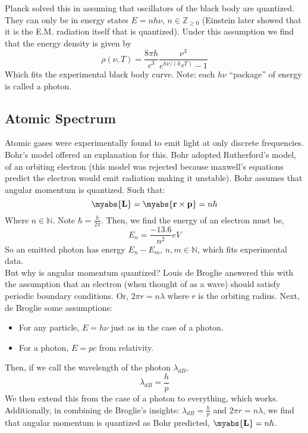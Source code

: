\documentclass[11pt]{article}
\theoremstyle{definition}
\begin{document}
Planck solved this in assuming that oscillators of the black body are
quantized. They can only be in energy states $E = nh\nu$, $n \in
\mathbb{Z}_{\geq 0}$ (Einstein later showed that it is the E.M. radiation
itself that is quantized). Under this assumption we find that the energy
density is given by
\begin{equation*}
    \rho(\nu, T) = \frac{8\pi h}{c^3}\frac{\nu^3}{e^{h \nu / (k_B T)}-1}
    \tag{Plank's Formula}
\end{equation*}
Which fits the experimental black body curve. Note: each $h\nu$ ``package''
of energy is called a photon.
\subsection{Atomic Spectrum}
Atomic gases were experimentally found to emit light at only discrete
frequencies.
Bohr's model offered an explanation for this.
Bohr adopted Rutherford's model, of an orbiting electron (this model was
rejected because maxwell's equations predict the electron would emit
radiation making it unstable). Bohr assumes that angular momentum is
quantized. Such that:
$$ \myabs{\mathbf{L}} = \myabs{\mathbf{r} \times \mathbf{p}} = n \hbar $$
Where $n \in \mathbb{N}$. Note $\hbar = \frac{h}{2\pi}$.
Then, we find the energy of an electron must be,
$$ E_n = \frac{-13.6}{n^2} eV $$
So an emitted photon has energy $E_n-E_m$, $n,m\in\mathbb{N}$, which fits
experimental data.
\\
But why is angular momentum quantized? Louis de Broglie answered this
with the assumption that an electron (when thought of as a wave) should
satisfy periodic boundary conditions. Or, $2\pi r = n \lambda$ where $r$ is
the orbiting radius. Next, de Broglie some assumptions:
\begin{itemize}
    \item For any particle, $E = h\nu$ just as in the case of a photon.
    \item For a photon, $E = pc$ from relativity.
\end{itemize}
Then, if we call the wavelength of the photon $\lambda_{dB}$,
$$ \lambda_{dB} = \frac{h}{p} $$
We then extend this from the case of a photon to everything, which works.
Additionally, in combining de Broglie's insights: $\lambda_{dB} =
\frac{h}{p}$ and $2\pi r = n\lambda$, we find that angular momentum is
quantized as Bohr predicted, $\myabs{\mathbf{L}} = n \hbar$.
\end{document}
